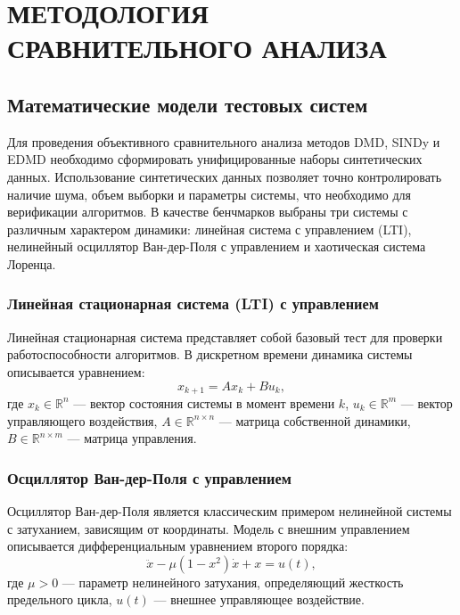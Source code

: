 \chapter{МЕТОДОЛОГИЯ СРАВНИТЕЛЬНОГО АНАЛИЗА}
\label{ch:methodology}

\section{Математические модели тестовых систем}
\label{sec:systems}

Для проведения объективного сравнительного анализа методов DMD, SINDy и EDMD необходимо сформировать унифицированные наборы синтетических данных. Использование синтетических данных позволяет точно контролировать наличие шума, объем выборки и параметры системы, что необходимо для верификации алгоритмов. В качестве бенчмарков выбраны три системы с различным характером динамики: линейная система с управлением (LTI), нелинейный осциллятор Ван-дер-Поля с управлением и хаотическая система Лоренца.

\subsection{Линейная стационарная система (LTI) с управлением}

Линейная стационарная система представляет собой базовый тест для проверки работоспособности алгоритмов. В дискретном времени динамика системы описывается уравнением:
\begin{equation}
\label{eq:lti}
x_{k+1} = A x_k + B u_k,
\end{equation}
где $x_k \in \mathbb{R}^n$ --- вектор состояния системы в момент времени $k$, $u_k \in \mathbb{R}^m$ --- вектор управляющего воздействия, $A \in \mathbb{R}^{n \times n}$ --- матрица собственной динамики, $B \in \mathbb{R}^{n \times m}$ --- матрица управления. 

\subsection{Осциллятор Ван-дер-Поля с управлением}

Осциллятор Ван-дер-Поля является классическим примером нелинейной системы с затуханием, зависящим от координаты. Модель с внешним управлением описывается дифференциальным уравнением второго порядка:
\begin{equation}
\label{eq:vdp_second_order}
\ddot{x} - \mu(1-x^2)\dot{x} + x = u(t),
\end{equation}
где $\mu > 0$ --- параметр нелинейного затухания, определяющий жесткость предельного цикла, $u(t)$ --- внешнее управляющее воздействие. 

